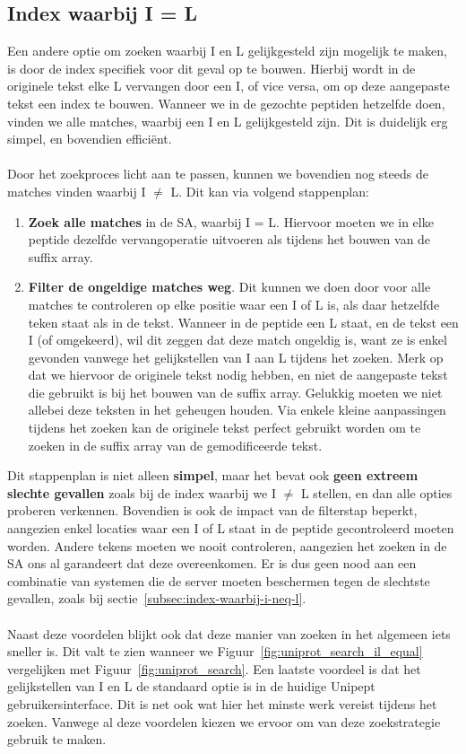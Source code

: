 \subsection{Index waarbij I = L}
Een andere optie om zoeken waarbij I en L gelijkgesteld zijn mogelijk te maken, is door de index specifiek voor dit geval op te bouwen.
Hierbij wordt in de originele tekst elke L vervangen door een I, of vice versa, om op deze aangepaste tekst een index te bouwen.
Wanneer we in de gezochte peptiden hetzelfde doen, vinden we alle matches, waarbij een I en L gelijkgesteld zijn.
Dit is duidelijk erg simpel, en bovendien efficiënt.
\\ \\
Door het zoekproces licht aan te passen, kunnen we bovendien nog steeds de matches vinden waarbij I $\neq$ L\@.
Dit kan via volgend stappenplan:
\begin{enumerate}
    \item \textbf{Zoek alle matches} in de SA, waarbij I = L\@.
    Hiervoor moeten we in elke peptide dezelfde vervangoperatie uitvoeren als tijdens het bouwen van de suffix array.
    \item \textbf{Filter de ongeldige matches weg}.
    Dit kunnen we doen door voor alle matches te controleren op elke positie waar een I of L is, als daar hetzelfde teken staat als in de tekst.
    Wanneer in de peptide een L staat, en de tekst een I (of omgekeerd), wil dit zeggen dat deze match ongeldig is, want ze is enkel gevonden vanwege het gelijkstellen van I aan L tijdens het zoeken.
    Merk op dat we hiervoor de originele tekst nodig hebben, en niet de aangepaste tekst die gebruikt is bij het bouwen van de suffix array.
    Gelukkig moeten we niet allebei deze teksten in het geheugen houden.
    Via enkele kleine aanpassingen tijdens het zoeken kan de originele tekst perfect gebruikt worden om te zoeken in de suffix array van de gemodificeerde tekst.
\end{enumerate}

Dit stappenplan is niet alleen \textbf{simpel}, maar het bevat ook \textbf{geen extreem slechte gevallen} zoals bij de index waarbij we I $\neq$ L stellen, en dan alle opties proberen verkennen.
Bovendien is ook de impact van de filterstap beperkt, aangezien enkel locaties waar een I of L staat in de peptide gecontroleerd moeten worden.
Andere tekens moeten we nooit controleren, aangezien het zoeken in de SA ons al garandeert dat deze overeenkomen.
Er is dus geen nood aan een combinatie van systemen die de server moeten beschermen tegen de slechtste gevallen, zoals bij sectie~\ref{subsec:index-waarbij-i-neq-l}.
\\ \\
Naast deze voordelen blijkt ook dat deze manier van zoeken in het algemeen iets sneller is.
Dit valt te zien wanneer we Figuur~\ref{fig:uniprot_search_il_equal} vergelijken met Figuur~\ref{fig:uniprot_search}.
Een laatste voordeel is dat het gelijkstellen van I en L de standaard optie is in de huidige Unipept gebruikersinterface.
Dit is net ook wat hier het minste werk vereist tijdens het zoeken.
Vanwege al deze voordelen kiezen we ervoor om van deze zoekstrategie gebruik te maken.

